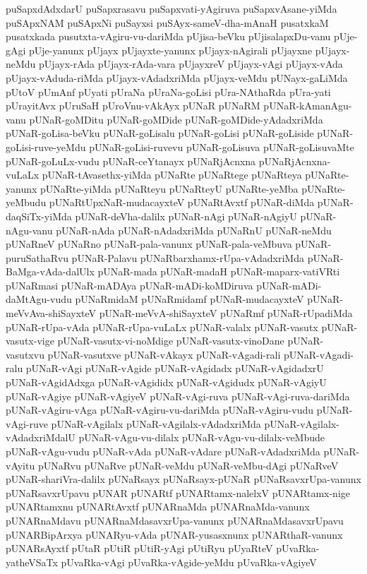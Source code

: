 {puSapxdAdxdarU
puSapxrasavu
puSapxvati-yAgiruva
puSapxvAsane-yiMda
puSApxNAM
puSApxNi
puSayxsi
puSAyx-sameV-dha-mAnaH
pusatxkaM
pusatxkada
pusutxta-vAgiru-vu-dariMda
pUjisa-beVku
pUjisalapxDu-vanu
pUje-gAgi
pUje-yanunx
pUjayx
pUjayxte-yanunx
pUjayx-nAgirali
pUjayxne
pUjayx-neMdu
pUjayx-rAda
pUjayx-rAda-vara
pUjayxreV
pUjayx-vAgi
pUjayx-vAda
pUjayx-vAduda-riMda
pUjayx-vAdadxriMda
pUjayx-veMdu
pUNayx-gaLiMda
pUtoV
pUmAnf
pUyati
pUraNa
pUraNa-goLisi
pUra-NAthaRda
pUra-yati
pUrayitAvx
pUruSaH
pUroVnu-vAkAyx
pUNaR
pUNaRM
pUNaR-kAmanAgu-vanu
pUNaR-goMDitu
pUNaR-goMDide
pUNaR-goMDide-yAdadxriMda
pUNaR-goLisa-beVku
pUNaR-goLisalu
pUNaR-goLisi
pUNaR-goLiside
pUNaR-goLisi-ruve-yeMdu
pUNaR-goLisi-ruvevu
pUNaR-goLisuva
pUNaR-goLisuvaMte
pUNaR-goLuLx-vudu
pUNaR-ceYtanayx
pUNaRjAcnxna
pUNaRjAcnxna-vuLaLx
pUNaR-tAvasethx-yiMda
pUNaRte
pUNaRtege
pUNaRteya
pUNaRte-yanunx
pUNaRte-yiMda
pUNaRteyu
pUNaRteyU
pUNaRte-yeMba
pUNaRte-yeMbudu
pUNaRtUpxNaR-mudacayxteV
pUNaRtAvxtf
pUNaR-diMda
pUNaR-daqSiTx-yiMda
pUNaR-deVha-dalilx
pUNaR-nAgi
pUNaR-nAgiyU
pUNaR-nAgu-vanu
pUNaR-nAda
pUNaR-nAdadxriMda
pUNaRnU
pUNaR-neMdu
pUNaRneV
pUNaRno
pUNaR-pala-vanunx
pUNaR-pala-veMbuva
pUNaR-puruSathaRvu
pUNaR-Palavu
pUNaRbarxhamx-rUpa-vAdadxriMda
pUNaR-BaMga-vAda-dalUlx
pUNaR-mada
pUNaR-madaH
pUNaR-maparx-vatiVRti
pUNaRmasi
pUNaR-mADAya
pUNaR-mADi-koMDiruva
pUNaR-mADi-daMtAgu-vudu
pUNaRmidaM
pUNaRmidamf
pUNaR-mudacayxteV
pUNaR-meVvAva-shiSayxteV
pUNaR-meVvA-shiSayxteV
pUNaRmf
pUNaR-rUpadiMda
pUNaR-rUpa-vAda
pUNaR-rUpa-vuLaLx
pUNaR-valalx
pUNaR-vasutx
pUNaR-vasutx-vige
pUNaR-vasutx-vi-noMdige
pUNaR-vasutx-vinoDane
pUNaR-vasutxvu
pUNaR-vasutxve
pUNaR-vAkayx
pUNaR-vAgadi-rali
pUNaR-vAgadi-ralu
pUNaR-vAgi
pUNaR-vAgide
pUNaR-vAgidadx
pUNaR-vAgidadxrU
pUNaR-vAgidAdxga
pUNaR-vAgididx
pUNaR-vAgidudx
pUNaR-vAgiyU
pUNaR-vAgiye
pUNaR-vAgiyeV
pUNaR-vAgi-ruva
pUNaR-vAgi-ruva-dariMda
pUNaR-vAgiru-vAga
pUNaR-vAgiru-vu-dariMda
pUNaR-vAgiru-vudu
pUNaR-vAgi-ruve
pUNaR-vAgilalx
pUNaR-vAgilalx-vAdadxriMda
pUNaR-vAgilalx-vAdadxriMdalU
pUNaR-vAgu-vu-dilalx
pUNaR-vAgu-vu-dilalx-veMbude
pUNaR-vAgu-vudu
pUNaR-vAda
pUNaR-vAdare
pUNaR-vAdadxriMda
pUNaR-vAyitu
pUNaRvu
pUNaRve
pUNaR-veMdu
pUNaR-veMbu-dAgi
pUNaRveV
pUNaR-shariVra-dalilx
pUNaRsayx
pUNaRsayx-pUNaR
pUNaRsavxrUpa-vanunx
pUNaRsavxrUpavu
pUNAR
pUNARtf
pUNARtamx-nalelxV
pUNARtamx-nige
pUNARtamxnu
pUNARtAvxtf
pUNARnaMda
pUNARnaMda-vanunx
pUNARnaMdavu
pUNARnaMdasavxrUpa-vanunx
pUNARnaMdasavxrUpavu
pUNARBipArxya
pUNARyu-vAda
pUNAR-yusasxnunx
pUNARthaR-vanunx
pUNARsAyxtf
pUtaR
pUtiR
pUtiR-yAgi
pUtiRyu
pUyaRteV
pUvaRka-yatheVSaTx
pUvaRka-vAgi
pUvaRka-vAgide-yeMdu
pUvaRka-vAgiyeV
}
